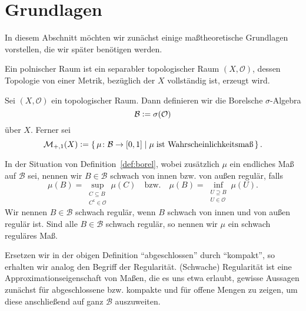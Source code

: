 \documentclass[../main/main.tex]{subfiles}
\begin{document}
	
	\section{Grundlagen}
	\label{Grundlagen}
	
	In diesem Abschnitt möchten wir zunächst einige maßtheoretische Grundlagen vorstellen, 
	die wir später benötigen werden.

	\begin{Definition}
		Ein polnischer Raum ist ein separabler topologischer Raum $(X, \mathcal{O})$, 
		dessen Topologie von einer Metrik, bezüglich der $X$ vollständig ist, erzeugt wird.
	\end{Definition}

	\begin{Definition}
		\label{def:borel}
		Sei $(X, \mathcal{O})$ ein topologischer Raum. Dann definieren wir die Borelsche 
		$\sigma$-Algebra
		$$\mathcal{B} \vcentcolon = \sigma(\mathcal{O})$$
		über $X$. Ferner sei
		$$\mathcal{M}_{+,1}(X) \vcentcolon = \left\{\, \mu \colon \mathcal{B} \to [0,1] \; | \; \mu \; 
			\text{ist Wahrscheinlichkeitsmaß} \,\right\}\text{.}$$
	\end{Definition}

	\begin{Definition}
		\label{def:regularity}
		In der Situation von Definition~\ref{def:borel}, wobei zusätzlich $\mu$ ein 
		endliches Maß auf $\mathcal{B}$ sei, nennen wir $B \in \mathcal{B}$ schwach von 
		innen bzw. von außen regulär, falls
		$$\mu(B) = \sup_{\substack{C \subseteq B \\ C^\mathsf{c} \in \mathcal{O}}} \mu(C) 
		\quad \text{bzw.} \quad \mu(B) = \inf_{\substack{U \supseteq B \\ U \in \mathcal{O}}} 
		\mu(U)\text{.}$$
		Wir nennen $B \in \mathcal{B}$ schwach regulär, wenn $B$ schwach von innen und 
		von außen regulär ist. Sind alle $B \in \mathcal{B}$ schwach regulär, 
		so nennen wir $\mu$ ein schwach reguläres Maß.
	\end{Definition}

	\begin{Bemerkung}
		Ersetzen wir in der obigen Definition \enquote{abgeschlossen} durch \enquote{kompakt}, 
		so erhalten wir analog den Begriff der Regularität. (Schwache) Regularität ist eine 
		Approximationseigenschaft von Maßen, die es uns etwa erlaubt, gewisse Aussagen 
		zunächst für abgeschlossene bzw. kompakte und für offene Mengen zu zeigen, um diese 
		anschließend auf ganz $\mathcal{B}$ auszuweiten.
	\end{Bemerkung}
\end{document}
